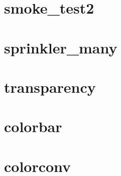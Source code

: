 \documentclass[11pt,twoside]{book}
\begin{document}
\section{smoke\_test2}
\label{SSFsmoketest2}

\section{sprinkler\_many}
\label{SSFspinklermany}

\section{transparency}
\label{SSFtransparency}

\section{colorbar}
\label{SSFcolorbar}

\section{colorconv}
\label{SSFcolorconv}
\end{document}
